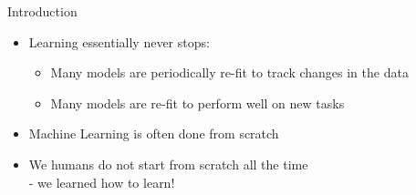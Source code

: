 
\begin{frame}[c]{Introduction}


\begin{itemize}
	\item Learning essentially never stops:
	\begin{itemize}
		\item Many models are periodically re-fit to track changes in the data
		\item Many models are re-fit to perform well on new tasks
	\end{itemize}
	
    \item Machine Learning is often done from scratch
    
    \item We humans do not start from scratch all the time \\ - we learned how to learn!
\end{itemize}

\end{frame}

	


